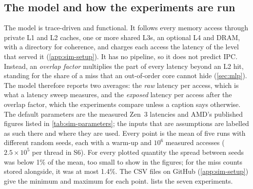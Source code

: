 \subsection{The model and how the experiments are run}
The model is trace-driven and functional. It follows every memory access through private L1 and L2 caches, one or more shared L3s, an optional L4 and DRAM, with a directory for coherence, and charges each access the latency of the level that served it (\cref{app:sim-setup}). It has no pipeline, so it does not predict IPC. Instead, an \emph{overlap factor} multiplies the part of every latency beyond an L2 hit, standing for the share of a miss that an out-of-order core cannot hide (\cref{sec:mlp}). The model therefore reports two averages: the \emph{raw} latency per access, which is what a latency sweep measures, and the \emph{exposed} latency per access after the overlap factor, which the experiments compare unless a caption says otherwise. The default parameters are the measured Zen~3 latencies and AMD's published figures listed in \cref{tab:sim-parameters}; the inputs that are assumptions are labelled as such there and where they are used. Every point is the mean of five runs with different random seeds, each with a warm-up and $10^6$ measured accesses ($2.5 \times 10^5$ per thread in S6). For every plotted quantity the spread between seeds was below 1\% of the mean, too small to show in the figures; for the miss counts stored alongside, it was at most 1.4\%. The CSV files on GitHub (\cref{app:sim-setup}) give the minimum and maximum for each point.  lists the seven experiments.

